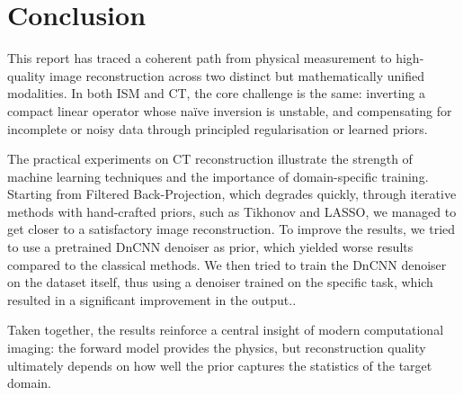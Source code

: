 \section{Conclusion}

This report has traced a coherent path from physical measurement to high-quality image reconstruction across two distinct but mathematically unified modalities. In both ISM and CT, the core challenge is the same: inverting a compact linear operator whose naïve inversion is unstable, and compensating for incomplete or noisy data through principled regularisation or learned priors.

The practical experiments on CT reconstruction illustrate the strength of machine learning techniques and the importance of domain-specific training. Starting from Filtered Back-Projection, which degrades quickly, through iterative methods with hand-crafted priors, such as Tikhonov and LASSO, we managed to get closer to a satisfactory image reconstruction. To improve the results, we tried to use a pretrained DnCNN denoiser as prior, which yielded worse results compared to the classical methods. We then tried to train the DnCNN denoiser on the dataset itself, thus using a denoiser trained on the specific task, which resulted in a significant improvement in the output..

Taken together, the results reinforce a central insight of modern computational imaging: the forward model provides the physics, but reconstruction quality ultimately depends on how well the prior captures the statistics of the target domain. 